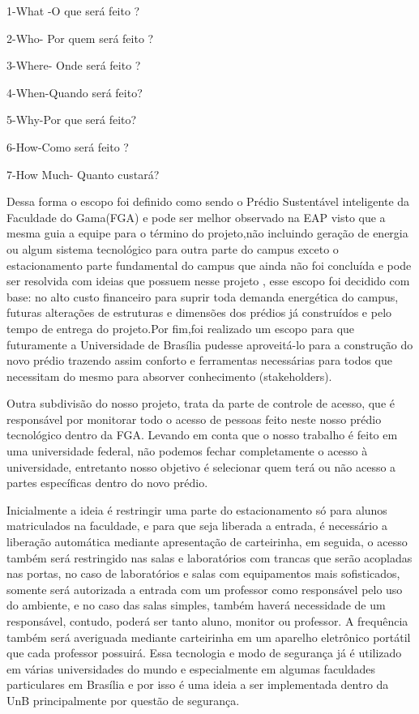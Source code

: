 1-What -O que será feito ?

2-Who- Por quem será feito ?

3-Where- Onde será feito ?

4-When-Quando será feito?

5-Why-Por que será feito?

6-How-Como será feito ?

7-How Much- Quanto custará?

Dessa forma o escopo foi definido como sendo o Prédio Sustentável inteligente da Faculdade do Gama(FGA) e pode ser melhor observado na EAP visto que a mesma guia a equipe para o término do projeto,não incluindo geração de energia ou algum sistema tecnológico para outra parte do campus exceto o estacionamento parte fundamental do campus que ainda não foi concluída e pode ser resolvida com ideias que possuem nesse projeto , esse escopo foi decidido com base: no  alto custo financeiro para suprir toda demanda energética do campus, futuras alterações de estruturas e dimensões dos prédios já construídos e pelo tempo de entrega do projeto.Por fim,foi realizado um escopo para que futuramente a Universidade de Brasília pudesse aproveitá-lo para a construção do novo prédio trazendo assim conforto e ferramentas necessárias para todos que necessitam do mesmo para absorver conhecimento (stakeholders).

Outra subdivisão do nosso projeto, trata da parte de controle de acesso, que é responsável por monitorar todo o acesso de pessoas feito neste nosso prédio tecnológico dentro da FGA. Levando em conta que o nosso trabalho é feito em uma universidade federal, não podemos fechar completamente o acesso à universidade, entretanto nosso objetivo é selecionar quem terá ou não acesso a partes específicas dentro do novo prédio.

Inicialmente a ideia é restringir uma parte do estacionamento só para alunos matriculados na faculdade, e para que seja liberada a entrada, é necessário a liberação automática mediante apresentação de carteirinha, em seguida, o acesso também será restringido nas salas e laboratórios com trancas que serão acopladas nas portas, no caso de laboratórios e salas com equipamentos mais sofisticados, somente será autorizada a entrada com um professor como responsável pelo uso do ambiente, e no caso das salas simples, também haverá necessidade de um responsável, contudo, poderá ser tanto aluno, monitor ou professor. A frequência também será averiguada mediante carteirinha em um aparelho eletrônico portátil que cada professor possuirá. Essa tecnologia e modo de segurança já é utilizado em várias universidades do mundo e especialmente em algumas faculdades particulares em Brasília e por isso é uma ideia a ser implementada dentro da UnB principalmente por questão de segurança.

